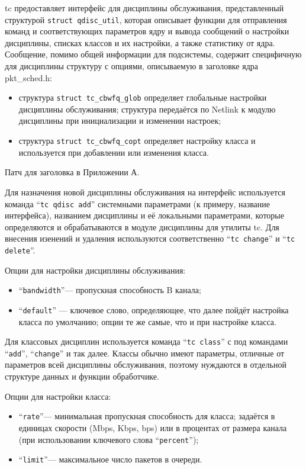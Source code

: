 	{tc} предоставляет интерфейс для дисциплины обслуживания,
	представленный структурой \lstinline{struct qdisc_util}, которая
	описывает функции для отправления команд и соответствующих параметров ядру
	и вывода сообщений о настройки дисциплины, списках классов и их настройки, а
	также статистику от ядра. Сообщение, помимо общей информации для подсистемы,
	содержит специфичную для дисциплины структуру с опциями, описываемую
	в заголовке ядра {pkt\_sched.h}:
	\begin{itemize}
		\item структура \lstinline{struct tc_cbwfq_glob} определяет глобальные настройки
			  дисциплины обслуживания; структура передаётся по Netlink к модулю дисциплины
			  при инициализации и изменении настроек;
		\item структура \lstinline{struct tc_cbwfq_copt} определяет настройку
			  класса и используется при добавлении или изменения класса.
	\end{itemize}

	Патч для заголовка в Приложении А.

	Для назначения новой дисциплины обслуживания на интерфейс используется
	команда ``\lstinline{tc qdisc add}''  системными параметрами (к примеру, название
	интерфейса), названием дисциплины и её локальными параметрами, которые
	определяются и обрабатываются в модуле дисциплины для утилиты {tc}. 
	Для внесения изенений и удаления используются соответственно ``\lstinline{tc change}''
	и  ``\lstinline{tc delete}''.

	Опции для настройки дисциплины обслуживания:
	\begin{itemize}
		\item ``\lstinline{bandwidth}''--- пропускная способность B канала;
		\item ``\lstinline{default}'' --- ключевое слово, определяющее, что далее пойдёт
									 настройка класса по умолчанию; опции те же самые, что
									 и при настройке класса.  
	\end{itemize}

	Для классовых дисциплин используется команда  ``\lstinline{tc class}'' с под командами
	 ``\lstinline{add}'',  ``\lstinline{change}'' и так далее. Классы обычно имеют параметры,
	отличные от параметров всей дисциплины обслуживания, поэтому нуждаются в отдельной
	структуре данных и функции обработчике.

	Опции для настройки класса:
	\begin{itemize}
		\item ``\lstinline{rate}''--- минимальная пропускная способность для класса;
											  задаётся в единицах скорости (Mbps, Kbps, bps) или в процентах
											  от размера канала (при использовании ключевого слова  ``\lstinline{percent}'');
		\item ``\lstinline{limit}''--- максимальное число пакетов в очереди.
	\end{itemize}


